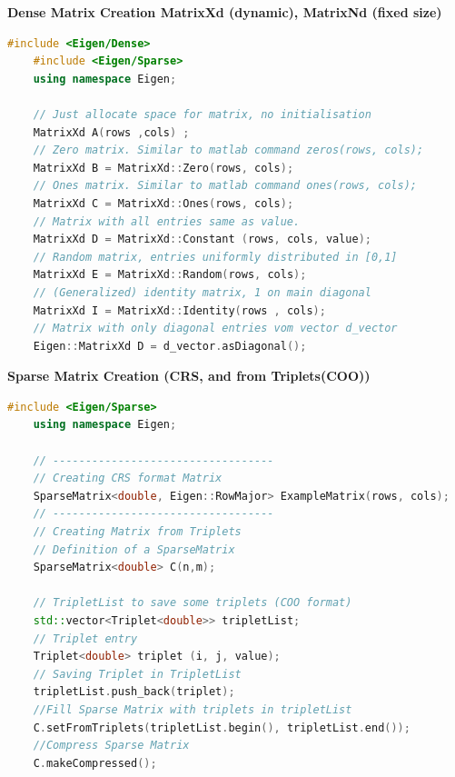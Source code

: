 \documentclass[12pt, a4paper]{article}
\begin{document}
\textbf{Dense Matrix Creation \hspace{20mm} \color{blue}MatrixXd (dynamic), MatrixNd (fixed size)}

\begin{lstlisting}[language=C++]
	#include <Eigen/Dense>
	#include <Eigen/Sparse>
	using namespace Eigen;
	
	// Just allocate space for matrix, no initialisation
	MatrixXd A(rows ,cols) ;
	// Zero matrix. Similar to matlab command zeros(rows, cols);
	MatrixXd B = MatrixXd::Zero(rows, cols);
	// Ones matrix. Similar to matlab command ones(rows, cols);
	MatrixXd C = MatrixXd::Ones(rows, cols);
	// Matrix with all entries same as value.
	MatrixXd D = MatrixXd::Constant (rows, cols, value);
	// Random matrix, entries uniformly distributed in [0,1]
	MatrixXd E = MatrixXd::Random(rows, cols);
	// (Generalized) identity matrix, 1 on main diagonal
	MatrixXd I = MatrixXd::Identity(rows , cols);
	// Matrix with only diagonal entries vom vector d_vector
	Eigen::MatrixXd D = d_vector.asDiagonal();
\end{lstlisting}

\textbf{Sparse Matrix Creation (CRS, and from Triplets(COO))}
\begin{lstlisting}[language=C++]
	#include <Eigen/Sparse>
	using namespace Eigen;
	
	// ----------------------------------
	// Creating CRS format Matrix
	SparseMatrix<double, Eigen::RowMajor> ExampleMatrix(rows, cols); 
	// ----------------------------------
	// Creating Matrix from Triplets
	// Definition of a SparseMatrix
	SparseMatrix<double> C(n,m);

	// TripletList to save some triplets (COO format)
	std::vector<Triplet<double>> tripletList;
	// Triplet entry
	Triplet<double> triplet (i, j, value); 	 
	// Saving Triplet in TripletList
	tripletList.push_back(triplet);
	//Fill Sparse Matrix with triplets in tripletList
	C.setFromTriplets(tripletList.begin(), tripletList.end());
	//Compress Sparse Matrix
	C.makeCompressed();
\end{lstlisting}
\end{document}
